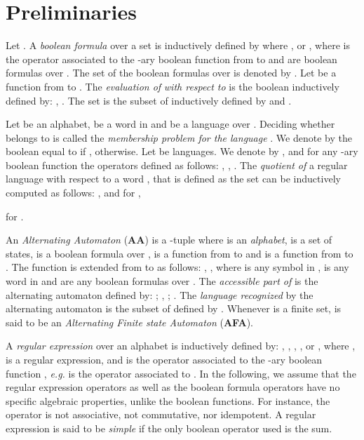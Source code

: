 \documentclass{article}
\begin{document}
\section{Preliminaries}\label{sec prelim}

  Let . A \emph{boolean formula}  over a set  is inductively defined by  where , or  , where  is the operator associated to the -ary boolean function  from  to  and  are boolean formulas over . The set of the boolean formulas over  is denoted by .
    Let  be a function from  to . The \emph{evaluation of}  \emph{with respect to}  is the boolean  inductively defined by: , . The set  is the subset of  inductively defined by  and .
    
    Let  be an alphabet,  be a word in  and  be a language over . Deciding whether  belongs to  is called the \emph{membership problem for the language} . We denote by  the boolean equal to  if ,  otherwise. Let  be  languages. We denote by ,  and  for any -ary boolean function  the operators defined as follows:
     ,
,     
      . The \emph{quotient of} a regular language  with respect to a word , that is defined as the set  can be inductively computed as follows: 
,  and for ,

	    
	      

 for .

  

  An \emph{Alternating Automaton} (\textbf{AA}) is a -tuple  where  is an \emph{alphabet},  is a set of states,  is a boolean formula over ,  is a function from  to  and  is a function from  to . The function  is extended from  to  as follows: , ,  where  is any symbol in ,  is any word in  and  are any  boolean formulas over .
  The \emph{accessible part of}  is the alternating automaton  defined by: 
;
  , ; .  
  The \emph{language recognized} by the alternating automaton  is the subset  of  defined by .
  Whenever  is a finite set,  is said to be an \emph{Alternating Finite state Automaton} (\textbf{AFA}).   
    
  A \emph{regular expression}  over an alphabet  is inductively defined by: , , , ,  or , where ,  is a regular expression,  and  is the operator associated to the -ary boolean function , \emph{e.g.}  is the operator associated to .
  In the following, we assume that the regular expression operators as well as the boolean formula operators have no specific algebraic properties, unlike the boolean functions. For instance, the operator  is not associative, not commutative, nor idempotent. 
 A regular expression is said to be \emph{simple} if the only boolean operator used is the sum.  
 
\end{document}

